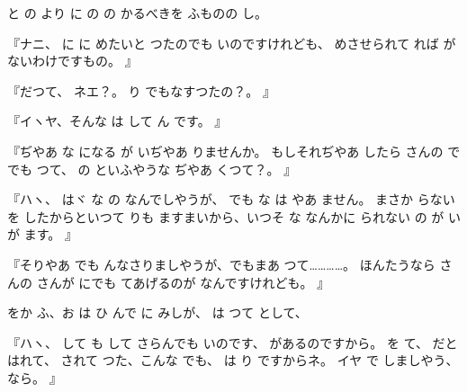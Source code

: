 と
の
より
に
の
の
かるべきを
ふものの
し。

『ナニ、
に
に
めたいと
つたのでも
いのですけれども、
めさせられて
れば
がないわけですもの。
』

『だつて、
ネエ？。
り
でもなすつたの？。
』

『イヽヤ、そんな
は
して
ん
です。
』

『ぢやあ
な
になる
が
いぢやあ
りませんか。
もしそれぢやあ
したら
さんの
で
でも
つて、
の
といふやうな
ぢやあ
くつて？。
』

『ハヽ、
はヾ
な
の
なんでしやうが、
でも
な
は
やあ
ません。
まさか
らない
を
したからといつて
りも
ますまいから、いつそ
な
なんかに
られない
の
が
い
が
ます。
』

『そりやあ
でも
んなさりましやうが、でもまあ
つて…………。
ほんたうなら
さんの
さんが
にでも
てあげるのが
なんですけれども。
』

をか
ふ、お
は
ひ
んで
に
みしが、
は
つて
として、

『ハヽ、
して
も
して
さらんでも
いのです、
があるのですから。
を
て、
だと
はれて、
されて
つた、こんな
でも、
は
り
ですからネ。
イヤ
で
しましやう、
なら。
』


